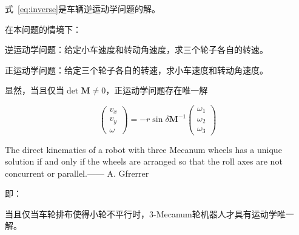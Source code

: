 式~\ref{eq:inverse}是车辆逆运动学问题的解。

在本问题的情境下：

\begin{definition}
    逆运动学问题：给定小车速度和转动角速度，求三个轮子各自的转速。
\end{definition}

\begin{definition}
    正运动学问题：给定三个轮子各自的转速，求小车速度和转动角速度。
\end{definition}

显然，当且仅当$\operatorname{det} \mathbf{M} \neq 0$，正运动学问题存在唯一解

\begin{equation}
    \left(\begin{array}{c}
    {v_{x}} \\
    {v_{y}} \\
    {\omega}
    \end{array}\right)=-r \sin \delta \mathbf{M}^{-1}\left(\begin{array}{c}
    {\omega_{1}} \\
    {\omega_{2}} \\
    {\omega_{3}}
    \end{array}\right)
\end{equation}

\begin{theorem}\label{the:theorem-en}
    The direct kinematics of a robot with three Mecanum wheels has a unique solution if and only if the wheels are arranged so that the roll axes are not concurrent or parallel.\hfill —— A. Gfrerrer
\end{theorem}

即：

\begin{theorem}\label{the:theorem-cn}
    当且仅当车轮排布使得小轮不平行时，3-Mecanum轮机器人才具有运动学唯一解。
\end{theorem}
